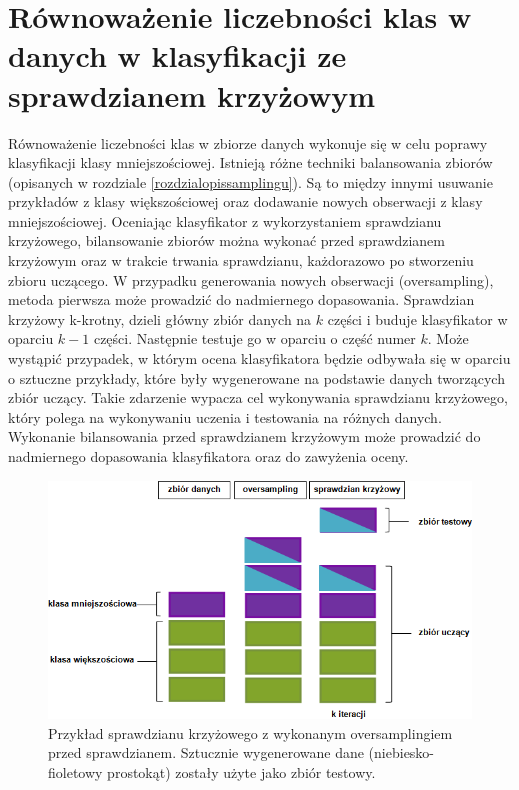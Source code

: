 \section{Równoważenie liczebności klas w danych w klasyfikacji ze sprawdzianem krzyżowym}
\label{rozdzialbalansowanie}
Równoważenie liczebności klas w zbiorze danych wykonuje się w celu poprawy klasyfikacji klasy mniejszościowej. Istnieją różne techniki balansowania zbiorów (opisanych w rozdziale \ref{rozdzialopissamplingu}). Są to między innymi usuwanie przykładów z klasy większościowej oraz dodawanie nowych obserwacji z klasy mniejszościowej. Oceniając klasyfikator z wykorzystaniem sprawdzianu krzyżowego, bilansowanie zbiorów można wykonać przed sprawdzianem krzyżowym oraz w trakcie trwania sprawdzianu, każdorazowo po stworzeniu zbioru uczącego. W przypadku generowania nowych obserwacji (oversampling), metoda pierwsza może prowadzić do nadmiernego dopasowania. Sprawdzian krzyżowy k-krotny, dzieli główny zbiór danych na $k$ części i buduje klasyfikator w oparciu $k-1$ części. Następnie testuje go w oparciu o część numer $k$. Może wystąpić przypadek, w którym ocena klasyfikatora będzie odbywała się w oparciu o sztuczne przykłady, które były wygenerowane na podstawie danych tworzących zbiór uczący. Takie zdarzenie wypacza cel wykonywania sprawdzianu krzyżowego, który polega na wykonywaniu uczenia i testowania na różnych danych. Wykonanie bilansowania przed sprawdzianem krzyżowym może prowadzić do nadmiernego dopasowania klasyfikatora oraz do zawyżenia oceny. 
\begin{figure}[H]
	\centering
	\includegraphics[width=\textwidth]{./images/oversampling.png}
	\caption[Sprawdzian krzyżowy z oversamplingiem]{Przykład sprawdzianu krzyżowego z wykonanym oversamplingiem przed sprawdzianem. Sztucznie wygenerowane dane (niebiesko-fioletowy prostokąt) zostały użyte jako zbiór testowy.}
	\label{fig:oversampling_wrong}
\end{figure}
